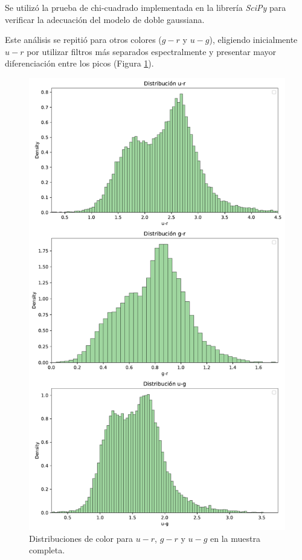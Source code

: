 \documentclass[twocolumn]{article}
\begin{document}
Se utilizó la prueba de chi-cuadrado implementada en la librería \textit{SciPy} \citep{SciPy} para verificar la adecuación del modelo de doble gaussiana.

Este análisis se repitió para otros colores ($g-r$ y $u-g$), eligiendo inicialmente $u-r$ por utilizar filtros más separados espectralmente y presentar mayor diferenciación entre los picos (Figura \ref{fig:colores}).

\begin{figure}[t]
\includegraphics[width=\linewidth]{rojas_azules_vertical.pdf}
\caption{Distribuciones de color para $u-r$, $g-r$ y $u-g$ en la muestra completa.}
\label{fig:colores}
\end{figure}
\end{document}
